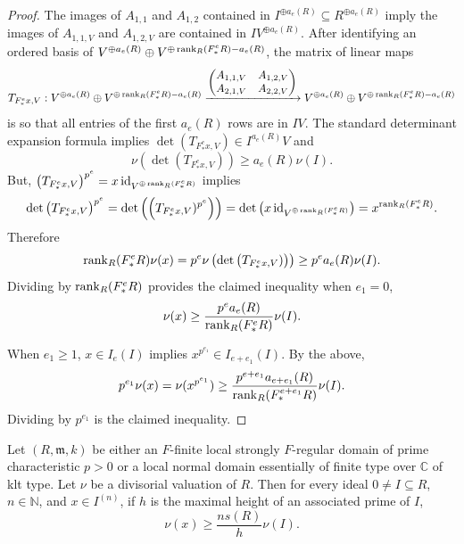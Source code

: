 \documentclass[12pt]{amsart}
\numberwithin{equation}{theorem}
\theoremstyle{plain}
\newcommand{\fm}{\mathfrak{m}}
\newcommand{\CC}{\mathbb{C}}
\newcommand{\NN}{\mathbb{N}}
\begin{document}
\begin{proof}
    The images of $A_{1,1}$ and $A_{1,2}$ contained in $I^{\oplus a_e(R)}\subseteq R^{\oplus a_e(R)}$ imply the images of $A_{1,1,V}$ and $A_{1,2,V}$ are contained in $IV^{\oplus a_e(R)}$. After identifying an ordered basis of $V^{\oplus a_e(R)} \oplus V^{\oplus \operatorname{{rank}}_R(F^e_*R)-a_e(R)}$, the matrix of linear maps
    \[
    T_{F^e_*x,V}: V^{\oplus a_e(R)} \oplus V^{\oplus \operatorname{{rank}}_R(F^e_*R)-a_e(R)} \xrightarrow{\begin{pmatrix}A_{1,1,V} & A_{1,2,V} \\ {A_{2,1,V}} & A_{2,2,V}\end{pmatrix}} V^{\oplus a_e(R)} \oplus V^{\oplus \operatorname{{rank}}_R(F^e_*R)-a_e(R)}
    \]
    is so that all entries of the first $a_e(R)$ rows are in $IV$. The standard determinant expansion formula implies $\det(T_{F^e_*x,V}) \in I^{a_e(R)}V$
    and
    \[
    \nu(\det(T_{F^e_*x,V}))\geq a_e(R)\nu(I).
    \]
    But, $\left(T_{F^e_*x,V}\right)^{p^e} = x\operatorname{{id}}_{V^{\oplus \operatorname{{rank}}_R(F^e_*R)}}$ implies
    \[
    \det\left(T_{F^e_*x,V}\right)^{p^e} = \det\left(\left(T_{F^e_*x,V})^{p^e}\right)\right) = \det\left(x\operatorname{{id}}_{V^{\oplus \operatorname{{rank}}_R(F^e_*R)}}\right) = x^{\operatorname{{rank}}_R(F^e_*R)}.
    \]
    Therefore
    \[
    \operatorname{{rank}}_R(F^e_*R)\nu(x) = p^e\nu\left(\det\left(T_{F^e_*x,V})\right)\right)\geq p^ea_e(R)\nu(I).
    \]
    Dividing by $\operatorname{{rank}}_R(F^e_*R)$ provides the claimed inequality when $e_1=0$,
    \[
    \nu(x)\geq \frac{p^ea_e(R)}{\operatorname{{rank}}_R(F^e_*R)}\nu(I).
    \]

    When $e_1\geq 1$, $x\in I_e(I)$ implies $x^{p^{e_1}}\in I_{e+e_1}(I)$. By the above,
    \[
    p^{e_1}\nu(x) = \nu(x^{p^{e_1}}) \geq \frac{p^{e+e_1}a_{e+e_1}(R)}{\operatorname{{rank}}_R(F^{e+e_1}_*R)}\nu(I).
    \]
    Dividing by $p^{e_1}$ is the claimed inequality.
\end{proof}

\begin{corollary}
    \label{cor: valuation bound general}
    Let $(R,\fm,k)$ be either an $F$-finite local strongly $F$-regular domain of prime characteristic $p>0$ or a local normal domain essentially of finite type over $\CC$ of klt type. Let $\nu$ be a divisorial valuation of $R$. Then for every ideal $0\not=I\subseteq R$, $n\in\NN$, and $x\in I^{(n)}$, if $h$ is the maximal height of an associated prime of $I$,
    \[
    \nu(x)\geq \frac{ns(R)}{h}\nu(I).
    \]
\end{corollary}
\end{document}
